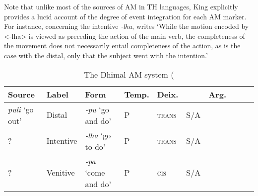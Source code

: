 \documentclass[oneside,a4paper,11pt]{article}
\newcommand{\ipa}[1]{{\phon\textit{#1}}}
\newcommand{\Y}{\Checkmark}
\newcommand{\N}{\XSolidBrush}
\newcommand{\rouge}[1]{{\color{red}#1}}
\begin{document}
Note that unlike most of the sources of AM in TH languages, King explicitly provides a lucid account of the degree of event integration for each AM marker. For instance, concerning the intentive \ipa{-lha}, \citet[177]{king09dhimal} writes `While the motion encoded by <-lha> is viewed as preceding the action of the main verb, the completeness of the movement does not necessarily entail completeness of the action, as is the case with the distal, only that the subject went with the intention.'

\begin{table}
\caption{The Dhimal AM system (\citet[173-188]{king09dhimal}} \label{tab:dhimal.am} \centering
\begin{tabular}{llllllllll}
\toprule
Source & Label &Form &Temp.& Deix. & & Arg. \\
\midrule
\ipa{puli} `go out' & Distal &	\ipa{-pu} `go and do' &	P &	\textsc{trans}&	S/A & \Y \\
? & Intentive &	\ipa{-lha} `go to do' &	P &	\textsc{trans}&	S/A & \N \\
? & Venitive &	\ipa{-pa} `come and do' &	P &	\textsc{cis}&	S/A & \Y \\
\bottomrule
\end{tabular}
\end{table}		

%
%
%
 
\end{document}
